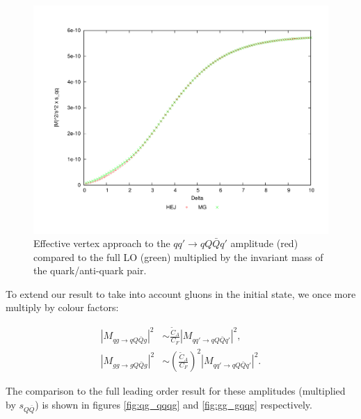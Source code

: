 \begin{figure}[H]
\centering
\includegraphics[scale=0.45]{Images/qQ_qqqxQ_sqqx.pdf}
\caption{Effective vertex approach to the $qq' \to qQ\bar{Q}q'$ amplitude (red) compared to the full LO (green) multiplied by the invariant mass of the quark/anti-quark pair.}
\label{fig:qq_qqqq_sqq}
\end{figure}

To extend our result to take into account gluons in the initial state, we once more multiply by colour factors:

\begin{equation}
\begin{split}
|M_{qg \to qQ\bar{Q}g}|^2 &\sim \frac{\tilde{C}_A}{C_F} |M_{qq' \to qQ\bar{Q}q'}|^2, \\
|M_{gg \to gQ\bar{Q}g}|^2 &\sim \left(\frac{\tilde{C}_A}{C_F}\right)^2 |M_{qq' \to qQ\bar{Q}q'}|^2.
\end{split}
\end{equation}

The comparison to the full leading order result for these amplitudes (multiplied by $s_{Q\bar{Q}}$) is shown in figures \ref{fig:qg_qqqg} and \ref{fig:gg_gqqg} respectively. 

